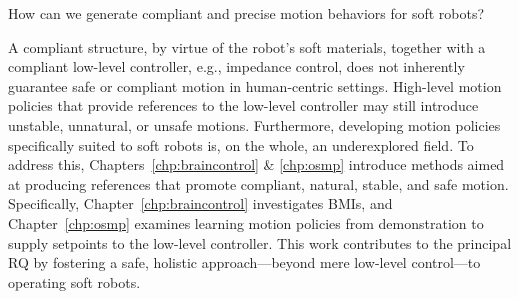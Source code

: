 \begin{researchquestion}\label{rq:compliant_motion_behaviors}
    How can we generate compliant and precise motion behaviors for soft robots?
\end{researchquestion}
A compliant structure, by virtue of the robot’s soft materials, together with a compliant low-level controller, e.g., impedance control, does not inherently guarantee safe or compliant motion in human-centric settings. High-level motion policies that provide references to the low-level controller may still introduce unstable, unnatural, or unsafe motions. Furthermore, developing motion policies specifically suited to soft robots is, on the whole, an underexplored field.
%
To address this, Chapters~\ref{chp:braincontrol} \& \ref{chp:osmp} introduce methods aimed at producing references that promote compliant, natural, stable, and safe motion. Specifically, Chapter~\ref{chp:braincontrol} investigates \glspl{BMI}, and Chapter~\ref{chp:osmp} examines learning motion policies from demonstration to supply setpoints to the low-level controller. This work contributes to the principal \gls{RQ} by fostering a safe, holistic approach—beyond mere low-level control—to operating soft robots.
